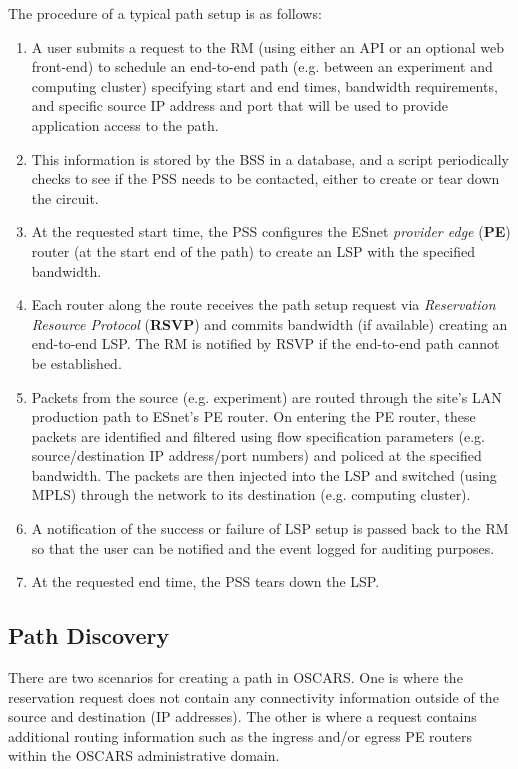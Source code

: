 \documentclass[conference]{IEEEtran}
\begin{document}
The procedure of a typical path setup is as follows:

\begin{enumerate}
\item
A user submits a request to the RM (using either an API or
an optional web front-end) to schedule an end-to-end path (e.g. between an
experiment and computing cluster) specifying start and end times, bandwidth
requirements, and specific source IP address and port that will be used to     
provide application access to the path.

\item
This information is stored by the BSS in a database, and a script 
periodically checks to see if the PSS needs to be contacted, either to create 
or tear down the circuit.

\item
At the requested start time, the PSS configures the 
ESnet \emph{provider edge} (\textbf{PE}) router
(at the start end of the path) to create an LSP with the
specified bandwidth.

\item
Each router along the route receives the path setup request 
via \emph{Reservation Resource Protocol} (\textbf{RSVP})
and commits bandwidth (if available) creating an end-to-end LSP.  The RM is
notified by RSVP if the end-to-end path cannot be established.

\item
Packets from the source (e.g. experiment) are routed through the site's
LAN production path to ESnet's PE router.  On entering the PE router,
these packets are identified and filtered using flow specification parameters
(e.g. source/destination IP address/port numbers) and policed at the specified
bandwidth.  The packets are then injected into the LSP and switched (using MPLS)
through the network to its destination (e.g. computing cluster).

\item
A notification of the success or failure of LSP setup is 
passed back to the RM so that the user can be notified and the event 
logged for auditing purposes.

\item
At the requested end time, the PSS tears down the LSP.
\end{enumerate}

\subsection{Path Discovery}
There are two scenarios for creating a path in OSCARS.  One is where the
reservation request does not contain any connectivity information outside of
the source and destination (IP addresses).  The other is where a request
contains additional routing information such as the ingress and/or egress 
PE routers within the OSCARS administrative domain.
\end{document}
